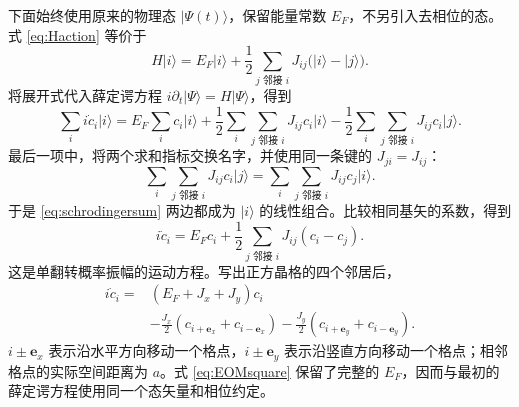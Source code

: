 \documentclass[UTF8,11pt,a4paper,fontset=fandol]{ctexart}
\newcommand{\ket}[1]{\lvert #1\rangle}
\begin{document}
下面始终使用原来的物理态 $\ket{\Psi(t)}$，保留能量常数 $E_F$，不另引入去相位的态。式 \eqref{eq:Haction} 等价于
\begin{equation}
H\ket{i}=E_F\ket{i}
+\frac12\sum_{j\text{ 邻接 }i}J_{ij}
\bigl(\ket{i}-\ket{j}\bigr).
\end{equation}
将展开式代入薛定谔方程 $i\partial_t\ket{\Psi}=H\ket{\Psi}$，得到
\begin{equation}
\sum_i i\dot c_i\ket{i}
=
E_F\sum_i c_i\ket{i}
+\frac12\sum_i\sum_{j\text{ 邻接 }i}J_{ij}c_i\ket{i}
-\frac12\sum_i\sum_{j\text{ 邻接 }i}J_{ij}c_i\ket{j}.
\label{eq:schrodingersum}
\end{equation}
最后一项中，将两个求和指标交换名字，并使用同一条键的 $J_{ji}=J_{ij}$：
\begin{equation}
\sum_i\sum_{j\text{ 邻接 }i}J_{ij}c_i\ket{j}
=
\sum_i\sum_{j\text{ 邻接 }i}J_{ij}c_j\ket{i}.
\end{equation}
于是 \eqref{eq:schrodingersum} 两边都成为 $\ket{i}$ 的线性组合。比较相同基矢的系数，得到
\begin{equation}
\boxed{
i\dot c_i
=E_Fc_i+\frac12\sum_{j\text{ 邻接 }i}J_{ij}(c_i-c_j).
}
\label{eq:EOMgeneral}
\end{equation}
这是单翻转概率振幅的运动方程。写出正方晶格的四个邻居后，
\begin{equation}
\boxed{
\begin{aligned}
i\dot c_i={}&(E_F+J_x+J_y)c_i\\
&-\frac{J_x}{2}
(c_{i+\mathbf e_x}+c_{i-\mathbf e_x})
-\frac{J_y}{2}
(c_{i+\mathbf e_y}+c_{i-\mathbf e_y}).
\end{aligned}
}
\label{eq:EOMsquare}
\end{equation}
$i\pm\mathbf e_x$ 表示沿水平方向移动一个格点，$i\pm\mathbf e_y$ 表示沿竖直方向移动一个格点；相邻格点的实际空间距离为 $a$。式 \eqref{eq:EOMsquare} 保留了完整的 $E_F$，因而与最初的薛定谔方程使用同一个态矢量和相位约定。
\end{document}
